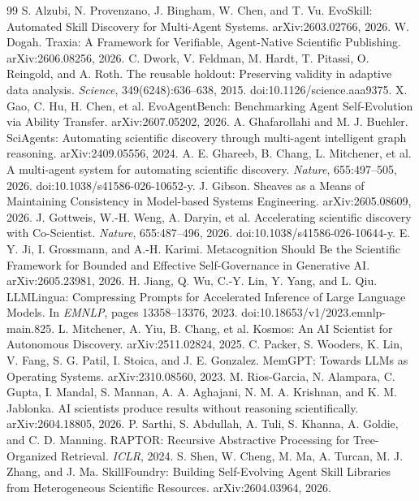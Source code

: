 \begin{thebibliography}{99}
 S. Alzubi, N. Provenzano, J. Bingham, W. Chen, and T. Vu. EvoSkill: Automated Skill Discovery for Multi-Agent Systems. arXiv:2603.02766, 2026.
 W. Dogah. Traxia: A Framework for Verifiable, Agent-Native Scientific Publishing. arXiv:2606.08256, 2026.
 C. Dwork, V. Feldman, M. Hardt, T. Pitassi, O. Reingold, and A. Roth. The reusable holdout: Preserving validity in adaptive data analysis. \emph{Science}, 349(6248):636--638, 2015. doi:10.1126/science.aaa9375.
 X. Gao, C. Hu, H. Chen, et al. EvoAgentBench: Benchmarking Agent Self-Evolution via Ability Transfer. arXiv:2607.05202, 2026.
 A. Ghafarollahi and M. J. Buehler. SciAgents: Automating scientific discovery through multi-agent intelligent graph reasoning. arXiv:2409.05556, 2024.
 A. E. Ghareeb, B. Chang, L. Mitchener, et al. A multi-agent system for automating scientific discovery. \emph{Nature}, 655:497--505, 2026. doi:10.1038/s41586-026-10652-y.
 J. Gibson. Sheaves as a Means of Maintaining Consistency in Model-based Systems Engineering. arXiv:2605.08609, 2026.
 J. Gottweis, W.-H. Weng, A. Daryin, et al. Accelerating scientific discovery with Co-Scientist. \emph{Nature}, 655:487--496, 2026. doi:10.1038/s41586-026-10644-y.
 E. Y. Ji, I. Grossmann, and A.-H. Karimi. Metacognition Should Be the Scientific Framework for Bounded and Effective Self-Governance in Generative AI. arXiv:2605.23981, 2026.
 H. Jiang, Q. Wu, C.-Y. Lin, Y. Yang, and L. Qiu. LLMLingua: Compressing Prompts for Accelerated Inference of Large Language Models. In \emph{EMNLP}, pages 13358--13376, 2023. doi:10.18653/v1/2023.emnlp-main.825.
 L. Mitchener, A. Yiu, B. Chang, et al. Kosmos: An AI Scientist for Autonomous Discovery. arXiv:2511.02824, 2025.
 C. Packer, S. Wooders, K. Lin, V. Fang, S. G. Patil, I. Stoica, and J. E. Gonzalez. MemGPT: Towards LLMs as Operating Systems. arXiv:2310.08560, 2023.
 M. Rios-Garcia, N. Alampara, C. Gupta, I. Mandal, S. Mannan, A. A. Aghajani, N. M. A. Krishnan, and K. M. Jablonka. AI scientists produce results without reasoning scientifically. arXiv:2604.18805, 2026.
 P. Sarthi, S. Abdullah, A. Tuli, S. Khanna, A. Goldie, and C. D. Manning. RAPTOR: Recursive Abstractive Processing for Tree-Organized Retrieval. \emph{ICLR}, 2024.
 S. Shen, W. Cheng, M. Ma, A. Turcan, M. J. Zhang, and J. Ma. SkillFoundry: Building Self-Evolving Agent Skill Libraries from Heterogeneous Scientific Resources. arXiv:2604.03964, 2026.

\end{thebibliography}
